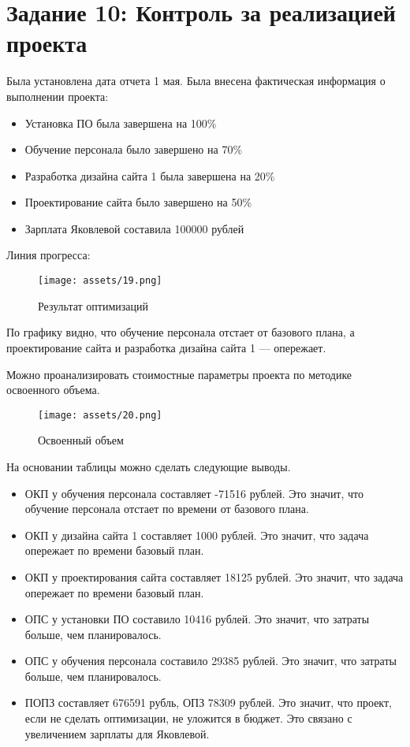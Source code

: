 \section{Задание 10: Контроль за реализацией проекта}

Была установлена дата отчета 1 мая. Была внесена фактическая информация о выполнении проекта:

\begin{itemize}
	\item Установка ПО была завершена на 100\%
	\item Обучение персонала было завершено на 70\%
	\item Разработка дизайна сайта 1 была завершена на 20\%
	\item Проектирование сайта было завершено на 50\%
	\item Зарплата Яковлевой составила 100000 рублей
\end{itemize}

Линия прогресса: 

\begin{figure}[H]
    \begin{center}
    \texttt{[image: assets/19.png]}
    \caption{Результат оптимизаций}
    \label{fig:19}
    \end{center}
\end{figure}

По графику видно, что обучение персонала отстает от базового плана, а проектирование сайта и разработка дизайна сайта 1 --- опережает.

Можно проанализировать стоимостные параметры проекта по методике освоенного объема.

\begin{figure}[H]
    \begin{center}
    \texttt{[image: assets/20.png]}
    \caption{Освоенный объем}
    \label{fig:20}
    \end{center}
\end{figure}

На основании таблицы можно сделать следующие выводы.

\begin{itemize}
	\item ОКП у обучения персонала составляет -71516 рублей. Это значит, что обучение персонала отстает по времени от базового плана.
	\item ОКП у дизайна сайта 1 составляет 1000 рублей. Это значит, что задача опережает по времени базовый план.
	\item ОКП у проектирования сайта составляет 18125 рублей. Это значит, что задача опережает по времени базовый план.
	\item ОПС у установки ПО составило 10416 рублей. Это значит, что затраты больше, чем планировалось.
	\item ОПС у обучения персонала составило 29385 рублей. Это значит, что затраты больше, чем планировалось.
	\item ПОПЗ составляет 676591 рубль, ОПЗ 78309 рублей. Это значит, что проект, если не сделать оптимизации, не уложится в бюджет. Это связано с увеличением зарплаты для Яковлевой.
\end{itemize}



